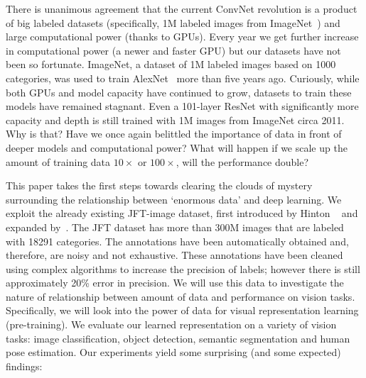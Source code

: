 \documentclass[10pt,twocolumn,letterpaper]{article}
\begin{document}
There is unanimous agreement that the current ConvNet revolution is a product of big labeled datasets (specifically, 1M labeled images from ImageNet~\cite{ImageNet}) and large computational power (thanks to GPUs). Every year we get further increase in computational power (a newer and faster GPU) but our datasets have not been so fortunate. ImageNet, a dataset of 1M labeled images based on 1000 categories, was used to train AlexNet~\cite{AlexNet} more than five years ago. Curiously, while both GPUs and model capacity
have continued to grow, datasets to train these models have remained stagnant. Even a 101-layer ResNet with significantly more capacity and depth is still trained with 1M images from ImageNet circa 2011.
Why is that? Have we once again belittled the importance of data in front of deeper models and computational power? What will happen if we scale up the amount of training data $10\times$ or $100\times$, will the performance double?

This paper takes the first steps towards clearing the clouds of mystery surrounding the relationship between `enormous data' and deep learning. 
We exploit the already existing JFT-image dataset, first introduced by Hinton \etal~\cite{Hinton} and expanded by~\cite{Chollet}. The JFT dataset has more than 300M images that are labeled with 18291 categories. The annotations have been automatically obtained and, therefore, are noisy and not exhaustive. These annotations have been cleaned using complex algorithms to increase the precision of labels; however there is still approximately 20\% error in precision. We will use this data to investigate the nature of relationship between amount of data and performance on vision tasks. Specifically, we will look into the power of data for visual representation learning (pre-training). 
We evaluate our learned representation on a variety of vision tasks: image classification, object detection, semantic segmentation and human pose estimation. Our experiments yield some surprising (and some expected) findings:
\end{document}
